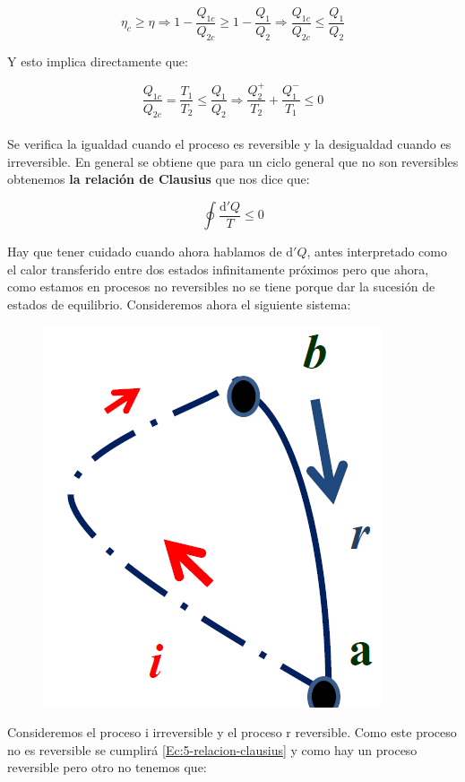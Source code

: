 \documentclass[12pt,a4paper]{article}
\newcommand{\D}{\mathrm{d}}
\begin{document}
$$ \eta_c \geq \eta \Longrightarrow 1 - \dfrac{Q_{1c}}{Q_{2c}} \geq 1 - \dfrac{Q_1}{Q_2} \Longrightarrow \dfrac{Q_{1c}}{Q_{2c}} \leq \dfrac{Q_1}{Q_2} $$

Y esto implica directamente que:

$$  \dfrac{Q_{1c}}{Q_{2c}} = \dfrac{T_1}{T_2} \leq \dfrac{Q_1}{Q_2}  \Longrightarrow \dfrac{Q_2^+}{T_2} + \dfrac{Q_1^-}{T_1} \leq 0 $$ \\

Se verifica la igualdad cuando el proceso es reversible y la desigualdad cuando es irreversible. En general se obtiene que para un ciclo general que no son reversibles obtenemos \textbf{la relación de Clausius} que nos dice que:

\begin{equation}
\oint \dfrac{\D ' Q}{T} \leq 0 \label{Ec:5-relacion-clausius}
\end{equation}

Hay que tener cuidado cuando ahora hablamos de $\D ' Q$, antes interpretado como el calor transferido entre dos estados infinitamente próximos pero que ahora, como estamos en procesos no reversibles no se tiene porque dar la sucesión de estados de equilibrio. Consideremos ahora el siguiente sistema:

\begin{figure}[h!] \centering
\includegraphics[scale=0.7]{Desigualdad-clausius.png}
\end{figure}

Consideremos el proceso i irreversible y el proceso r reversible. Como este proceso no es reversible se cumplirá \ref{Ec:5-relacion-clausius} y como hay un proceso reversible pero otro no tenemos que: \\
\end{document}
